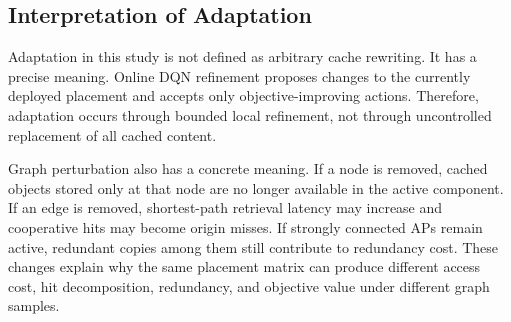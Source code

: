 \subsection{Interpretation of Adaptation}

Adaptation in this study is not defined as arbitrary cache rewriting. It has a precise meaning. Online DQN refinement proposes changes to the currently deployed placement and accepts only objective-improving actions. Therefore, adaptation occurs through bounded local refinement, not through uncontrolled replacement of all cached content.

Graph perturbation also has a concrete meaning. If a node is removed, cached objects stored only at that node are no longer available in the active component. If an edge is removed, shortest-path retrieval latency may increase and cooperative hits may become origin misses. If strongly connected APs remain active, redundant copies among them still contribute to redundancy cost. These changes explain why the same placement matrix can produce different access cost, hit decomposition, redundancy, and objective value under different graph samples.
